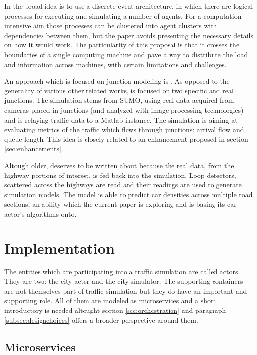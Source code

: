 \documentclass[conference]{IEEEtran}
\begin{document}
In \cite{8569576} the broad idea is to use a discrete event architecture, in which there are logical processes for executing and simulating a number of agents. For a computation intensive aim those processes can be clustered into agent clusters with dependencies between them, but the paper avoids presenting the necessary details on how it would work. The particularity of this proposal is that it crosses the boundaries of a single computing machine and pave a way to distribute the load and information across machines, with certain limitations and challenges.

An approach which is focused on junction modeling is \cite{urban-traffic-sim}. As opposed to the generality of various other related works, \cite{urban-traffic-sim} is focused on two specific and real junctions. The simulation stems from SUMO, using real data acquired from cameras placed in junctions (and analyzed with image processing technologies) and is relaying traffic data to a Matlab instance. The simulation is aiming at evaluating metrics of the traffic which flows through junctions: arrival flow and queue length. This idea is closely related to an enhancement proposed in section \ref{sec:enhancements}.

Altough older, \cite{7004985} deserves to be written about because the real data, from the highway portions of interest, is fed back into the simulation. Loop detectors, scattered across the highways are read and their readings are used to generate simulation models. The model is able to predict car densities across multiple road sections, an ability which the current paper is exploring and is basing its car actor's algorithms onto.

\section{Implementation}
\label{sec:implementation}

The entities which are participating into a traffic simulation are called actors. They are two: the city actor and the city simulator. The supporting containers are not themselves part of traffic simulation but they do have an important and supporting role. All of them are modeled as microservices and a short introductory is needed altought section \ref{sec:orchestration} and paragraph \ref{subsec:designchoices} offers a broader perspective around them.

\subsection{Microservices}
\end{document}
